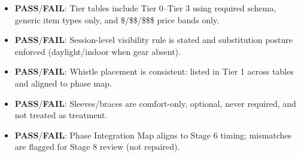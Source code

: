 \documentclass[10pt]{article}
\begin{document}
\begin{itemize}
\item \textbf{PASS}/\textbf{FAIL}: Tier tables include Tier 0–Tier 3 using required schema, generic item types only, and \$/\$\$/\$\$\$ price bands only.
\item \textbf{PASS}/\textbf{FAIL}: Session-level visibility rule is stated and substitution posture enforced (daylight/indoor when gear absent).
\item \textbf{PASS}/\textbf{FAIL}: Whistle placement is consistent: listed in Tier 1 across tables and aligned to phase map.
\item \textbf{PASS}/\textbf{FAIL}: Sleeves/braces are comfort-only, optional, never required, and not treated as treatment.
\item \textbf{PASS}/\textbf{FAIL}: Phase Integration Map aligns to Stage 6 timing; mismatches are flagged for Stage 8 review (not repaired).
\end{itemize}
\end{document}
